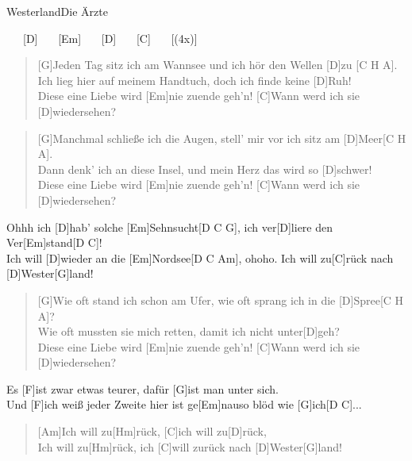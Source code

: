 \begin{song}{Westerland}{Die Ärzte}

    \begin{intro}
        [G] \ \ \ [D] \ \ \ [Em] \ \ \ [D] \ \ \ [C] \ \ \ [(4x)]
    \end{intro}

    \begin{verse}
        [G]Jeden Tag sitz ich am Wannsee und ich hör den Wellen [D]zu [C H A]. \\
        [G]Ich lieg hier auf meinem Handtuch, doch ich finde keine [D]Ruh! \\
        [C]Diese eine Liebe wird [Em]nie zuende geh'n! [C]Wann werd ich sie [D]wiedersehen?
    \end{verse}
    
    \begin{verse}
        [G]Manchmal schließe ich die Augen, stell' mir vor ich sitz am [D]Meer[C H A]. \\
        [G]Dann denk' ich an diese Insel, und mein Herz das wird so [D]schwer! \\
        [C]Diese eine Liebe wird [Em]nie zuende geh'n! [C]Wann werd ich sie [D]wiedersehen? 
    \end{verse}

    \begin{chorus}
        [G]Ohhh ich [D]hab' solche [Em]Sehnsucht[D C G], 
        \hspace{1em}ich ver[D]liere den Ver[Em]stand[D C]! \\
        [G]Ich will [D]wieder an die [Em]Nordsee[D C Am], \hspace{1.5 em}ohoho. 
        Ich will zu[C]rück nach [D]Wester[G]land!
    \end{chorus}

    \begin{verse}
        [G]Wie oft stand ich schon am Ufer, wie oft sprang ich in die [D]Spree[C H A]? \\
        [G]Wie oft mussten sie mich retten, damit ich nicht unter[D]geh? \\
        [C]Diese eine Liebe wird [Em]nie zuende geh'n! [C]Wann werd ich sie [D]wiedersehen?
    \end{verse}
    

    \begin{bridge}
        Es [F]ist zwar etwas teurer, dafür [G]ist man unter sich. \\
        Und [F]ich weiß jeder Zweite hier ist ge[Em]nauso blöd wie [G]ich[D C]...
    \end{bridge}
    
    
    \begin{verse}
        [Am]Ich will zu[Hm]rück, [C]ich will zu[D]rück, \\
        [Am]Ich will zu[Hm]rück, ich [C]will zurück nach [D]Wester[G]land!
    \end{verse}

\end{song}
